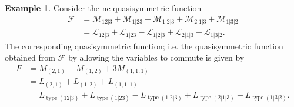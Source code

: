 \documentclass[12pt,reqno]{amsart}
\numberwithin{definition}{section}
\theoremstyle{definition}
\newtheorem{example}[definition]{Example}
\newcommand{\type}{\operatorname{type}}
\newcommand{\ncM}{\mathcal{M}}
\newcommand{\ncL}{\mathcal{L}}
\newcommand{\comment}[1]{\textsf{\footnotesize #1}}
\begin{document}
\begin{example}

Consider the nc-quasisymmetric function 
\begin{align*}
 \mathcal{F} & = \ncM_{12|3} + \ncM_{1|23} + \ncM_{1|2|3} + \ncM_{2|1|3} + \ncM_{1|3|2}\\
      & = \ncL_{12|3} + \ncL_{1|23} - \ncL_{1|2|3} + \ncL_{2|1|3} + \ncL_{1|3|2}.
\end{align*}
The corresponding quasisymmetric function; i.e. the quasisymmetric function obtained from $\mathcal{F}$ by allowing the variables to commute is given by
\begin{align*}
 F & = M_{(2,1)} + M_{(1,2)} + 3M_{(1,1,1)}\\
 & = L_{(2,1)} + L_{(1,2)} + L_{(1,1,1)}\\
& = L_{\type(12|3)} + L_{\type(1|23)} - L_{\type(1|2|3)} + L_{\type(2|1|3)} + L_{\type(1|3|2)}.
\end{align*}

\end{example}






\end{document}
